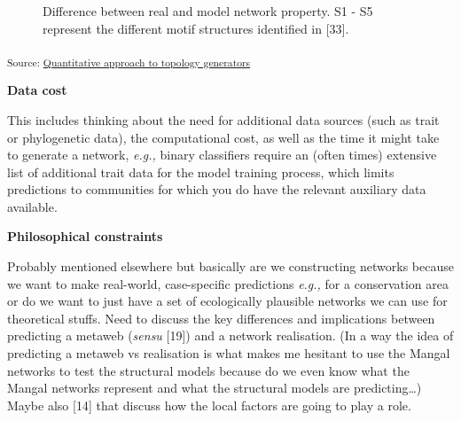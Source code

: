 \documentclass[
]{article}
\begin{document}
\begin{tcolorbox}
\begin{figure}[H]

\caption{\label{fig-topology}Difference between real and model network
property. S1 - S5 represent the different motif structures identified in
{[}33{]}.}

\end{figure}%

\textsubscript{Source:
\href{https://BecksLab.github.io/ms_t_is_for_topology/notebooks/model_quantitative-preview.html\#cell-fig-topology}{Quantitative
approach to topology generators}}

\textbf{Data cost}

This includes thinking about the need for additional data sources (such
as trait or phylogenetic data), the computational cost, as well as the
time it might take to generate a network, \emph{e.g.,} binary
classifiers require an (often times) extensive list of additional trait
data for the model training process, which limits predictions to
communities for which you do have the relevant auxiliary data available.

\textbf{Philosophical constraints}

Probably mentioned elsewhere but basically are we constructing networks
because we want to make real-world, case-specific predictions
\emph{e.g.,} for a conservation area or do we want to just have a set of
ecologically plausible networks we can use for theoretical stuffs. Need
to discuss the key differences and implications between predicting a
metaweb (\emph{sensu} {[}19{]}) and a network realisation. (In a way the
idea of predicting a metaweb vs realisation is what makes me hesitant to
use the Mangal networks to test the structural models because do we even
know what the Mangal networks represent and what the structural models
are predicting\ldots) Maybe also {[}14{]} that discuss how the local
factors are going to play a role.


\end{tcolorbox}
\end{document}
